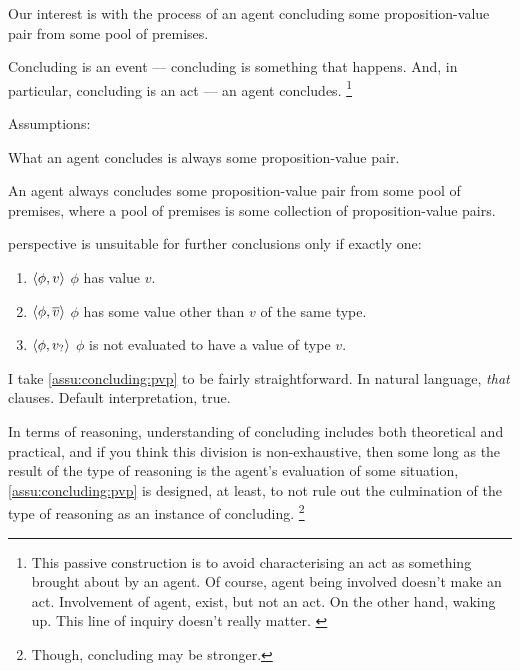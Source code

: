 \begin{note}
  Our interest is with the process of an agent concluding some proposition-value pair from some pool of premises.

  Concluding is an event --- concluding is something that happens.
  And, in particular, concluding is an act --- an agent concludes.%
  \footnote{
    \color{red}
    This passive construction is to avoid characterising an act as something brought about by an agent.
    Of course, agent being involved doesn't make an act.
    Involvement of agent, exist, but not an act.
    On the other hand, waking up.
    {
      \color{red} This line of inquiry doesn't really matter.
    }
  }

  Assumptions:

  \begin{assumption}
    \label{assu:concluding:pvp}
    What an agent concludes is always some proposition-value pair.
  \end{assumption}

  \begin{assumption}
    \label{assu:concluding:pools}
    An agent always concludes some proposition-value pair from some pool of premises, where a pool of premises is some collection of proposition-value pairs.
  \end{assumption}

  \begin{assumption}
    \label{assu:concluding:consistent}
    perspective is unsuitable for further conclusions only if exactly one:
    \begin{enumerate}
    \item
      \(\langle \phi, v \rangle\) \hfill \(\phi\) has value \(v\).
    \item
      \(\langle \phi, \overline{v} \rangle\) \hfill \(\phi\) has some value other than \(v\) of the same type.
    \item
      \(\langle \phi, v_{?} \rangle\) \hfill \(\phi\) is not evaluated to have a value of type \(v\).
    \end{enumerate}
  \end{assumption}
\end{note}

\begin{note}
  I take \autoref{assu:concluding:pvp} to be fairly straightforward.
  In natural language, \emph{that} clauses.
  Default interpretation, true.

  In terms of reasoning, understanding of concluding includes both theoretical and practical, and if you think this division is non-exhaustive, then some long as the result of the type of reasoning is the agent's evaluation of some situation, \autoref{assu:concluding:pvp} is designed, at least, to not rule out the culmination of the type of reasoning as an instance of concluding.%
  \footnote{
    Though, concluding may be stronger.
  }
\end{note}

